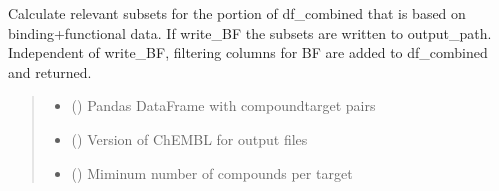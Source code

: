 \documentclass[letterpaper,10pt,english]{sphinxmanual}
\begin{document}
\begin{fulllineitems}
\label{\detokenize{write_subsets:write_subsets.write_BF_to_file}}
\pysigstartsignatures
{}
\pysigstopsignatures
\sphinxAtStartPar
Calculate relevant subsets for the portion of df\_combined that is based on binding+functional data.
If write\_BF the subsets are written to output\_path.
Independent of write\_BF, filtering columns for BF are added to df\_combined and returned.
\begin{quote}\begin{description}
\begin{itemize}
\item {} 
\sphinxAtStartPar
{} () \textendash{} Pandas DataFrame with compound\sphinxhyphen{}target pairs

\item {} 
\sphinxAtStartPar
{} () \textendash{} Version of ChEMBL for output files

\item {} 
\sphinxAtStartPar
{} () \textendash{} Miminum number of compounds per target


\end{itemize}
\end{description}
\end{quote}
\end{fulllineitems}
\end{document}
